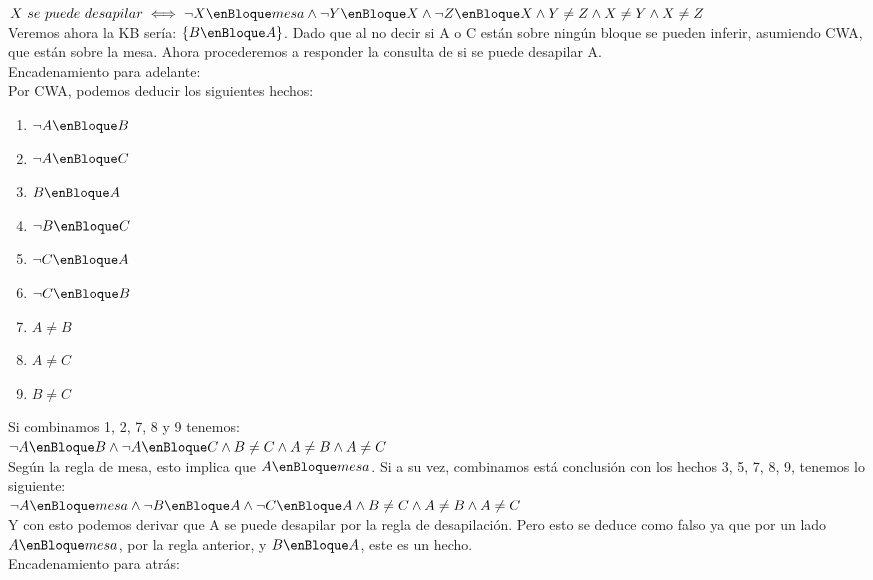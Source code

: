 $X\ se\ puede\ desapilar \iff \neg X \enBloque mesa \wedge \neg Y \enBloque X \wedge \neg Z \enBloque X \wedge Y \neq Z \wedge X \neq Y \wedge X \neq Z$ \\

Veremos ahora la KB sería: $\{B \enBloque A\}$. Dado que al no decir si A o C están sobre ningún bloque se pueden inferir, asumiendo CWA, que están sobre la mesa. Ahora procederemos a responder la consulta de si se puede desapilar A. \\

Encadenamiento para adelante: \\

Por CWA, podemos deducir los siguientes hechos:\\

\begin{enumerate}
	\item $\neg A \enBloque B$
	\item $\neg A \enBloque C$
	\item $B \enBloque A$
	\item $\neg B \enBloque C$
	\item $\neg C \enBloque A$
	\item $\neg C \enBloque B$
	\item $A \neq B$
	\item $A \neq C$
	\item $B \neq C$
\end{enumerate}

Si combinamos 1, 2, 7, 8 y 9 tenemos: \\

$\neg A \enBloque B \wedge \neg A \enBloque C \wedge B \neq C \wedge A \neq B \wedge A \neq C$ \\

Según la regla de mesa, esto implica que $A \enBloque mesa$. Si a su vez, combinamos está conclusión con los hechos 3, 5, 7, 8, 9, tenemos lo siguiente:\\ 

$\neg A \enBloque mesa \wedge \neg B \enBloque A \wedge \neg C \enBloque A \wedge B \neq C \wedge A \neq B \wedge A \neq C$ \\

Y con esto podemos derivar que A se puede desapilar por la regla de desapilación. Pero esto se deduce como falso ya que por un lado $A \enBloque mesa$, por la regla anterior, y $B \enBloque A$, este es un hecho.\\

Encadenamiento para atrás: \\

